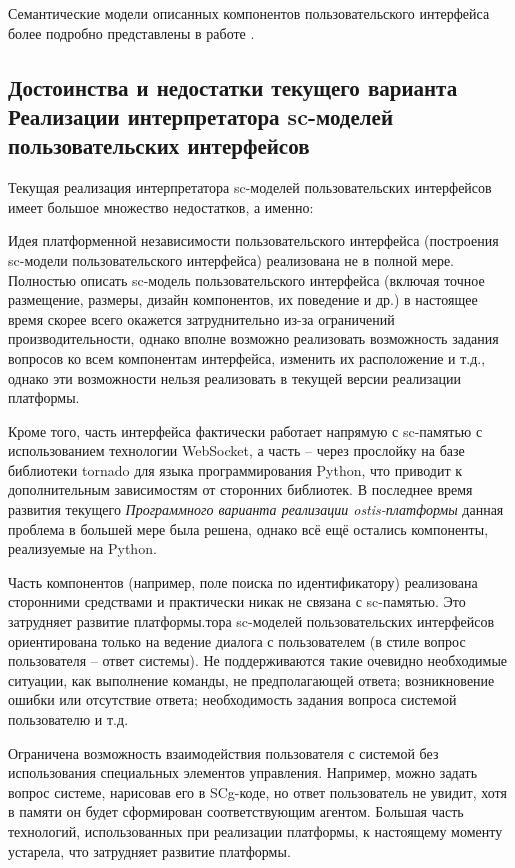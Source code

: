 Семантические модели описанных компонентов пользовательского интерфейса более подробно представлены в работе \cite{sadouski2022semantic}.

\subsection{Достоинства и недостатки текущего варианта Реализации интерпретатора sc-моделей пользовательских интерфейсов}
\label{sec_soft_platform_sci_machine_problems}

Текущая реализация интерпретатора sc-моделей пользовательских интерфейсов имеет большое множество недостатков, а именно:
\begin{textitemize}
	\item Идея платформенной независимости пользовательского интерфейса (построения sc-модели пользовательского интерфейса) реализована не в полной мере. Полностью описать sc-модель пользовательского интерфейса (включая точное размещение, размеры, дизайн компонентов, их поведение и др.) в настоящее время скорее всего окажется затруднительно из-за ограничений производительности, однако вполне возможно реализовать возможность задания вопросов ко всем компонентам интерфейса, изменить их расположение и т.д., однако эти возможности нельзя реализовать в текущей версии реализации платформы.
	\item Кроме того, часть интерфейса фактически работает напрямую с sc-памятью с использованием технологии WebSocket, а часть -- через прослойку на базе библиотеки tornado для языка программирования Python, что приводит к дополнительным зависимостям от сторонних библиотек. В последнее время развития текущего \textit{Программного варианта реализации ostis-платформы} данная проблема в большей мере была решена, однако всё ещё остались компоненты, реализуемые на Python.
	\item Часть компонентов (например, поле поиска по идентификатору) реализована сторонними средствами и практически никак не связана с sc-памятью. Это затрудняет развитие платформы.тора sc-моделей пользовательских интерфейсов ориентирована только на ведение диалога с пользователем (в стиле вопрос пользователя -- ответ системы). Не поддерживаются такие очевидно необходимые ситуации, как выполнение команды, не предполагающей ответа; возникновение ошибки или отсутствие ответа; необходимость задания вопроса системой пользователю и т.д.
	\item Ограничена возможность взаимодействия пользователя с системой без использования специальных элементов управления. Например, можно задать вопрос системе, нарисовав его в SCg-коде, но ответ пользователь не увидит, хотя в памяти он будет сформирован соответствующим агентом. Большая часть технологий, использованных при реализации платформы, к настоящему моменту устарела, что затрудняет развитие платформы.

\end{textitemize}
